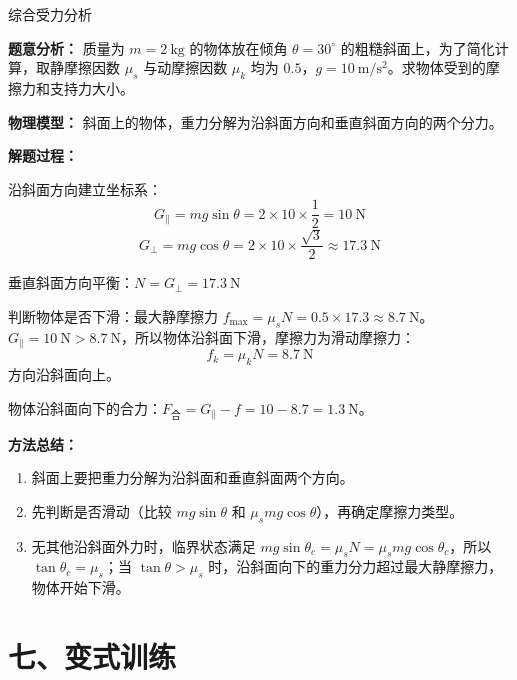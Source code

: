 \begin{examplebox}{综合受力分析}

\textbf{题意分析：} 质量为 $m = 2\ \mathrm{kg}$ 的物体放在倾角 $\theta = 30^\circ$ 的粗糙斜面上，为了简化计算，取静摩擦因数 $\mu_s$ 与动摩擦因数 $\mu_k$ 均为 $0.5$，$g = 10\ \mathrm{m/s^2}$。求物体受到的摩擦力和支持力大小。

\textbf{物理模型：} 斜面上的物体，重力分解为沿斜面方向和垂直斜面方向的两个分力。

\begin{center}


\label{fig:incline-force-decomposition}
\end{center}

\textbf{解题过程：}

沿斜面方向建立坐标系：
\[
G_{\parallel} = mg\sin\theta = 2 \times 10 \times \frac12 = 10\ \mathrm{N}
\]
\[
G_{\perp} = mg\cos\theta = 2 \times 10 \times \frac{\sqrt{3}}{2} \approx 17.3\ \mathrm{N}
\]

垂直斜面方向平衡：$N = G_{\perp} = 17.3\ \mathrm{N}$

判断物体是否下滑：最大静摩擦力 $f_{\max} = \mu_s N = 0.5 \times 17.3 \approx 8.7\ \mathrm{N}$。
$G_{\parallel} = 10\ \mathrm{N} > 8.7\ \mathrm{N}$，所以物体沿斜面下滑，摩擦力为滑动摩擦力：
\[
f_k = \mu_k N = 8.7\ \mathrm{N}
\]
方向沿斜面向上。

物体沿斜面向下的合力：$F_{\text{合}} = G_{\parallel} - f = 10 - 8.7 = 1.3\ \mathrm{N}$。

\textbf{方法总结：}
\begin{enumerate}
  \item 斜面上要把重力分解为沿斜面和垂直斜面两个方向。
  \item 先判断是否滑动（比较 $mg\sin\theta$ 和 $\mu_s mg\cos\theta$），再确定摩擦力类型。
  \item 无其他沿斜面外力时，临界状态满足 $mg\sin\theta_c=\mu_sN=\mu_smg\cos\theta_c$，所以 $\tan\theta_c=\mu_s$；当 $\tan\theta>\mu_s$ 时，沿斜面向下的重力分力超过最大静摩擦力，物体开始下滑。
\end{enumerate}

\end{examplebox}

\section*{七、变式训练}

